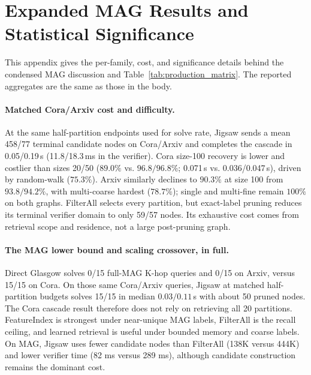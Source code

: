 \documentclass{article}
\begin{document}
\section{Expanded MAG Results and Statistical Significance}
\label{app:mag_narrative}

This appendix gives the per-family, cost, and significance details behind the condensed MAG discussion and Table~\ref{tab:production_matrix}. The reported aggregates are the same as those in the body.

\paragraph{Matched Cora/Arxiv cost and difficulty.} At the same half-partition endpoints used for solve rate, Jigsaw sends a mean 458/77 terminal candidate nodes on Cora/Arxiv and completes the cascade in 0.05/0.19\,s (11.8/18.3\,ms in the verifier). Cora size-100 recovery is lower and costlier than sizes 20/50 ($89.0\%$ vs. $96.8/96.8\%$; 0.071\,s vs. 0.036/0.047\,s), driven by random-walk ($75.3\%$). Arxiv similarly declines to $90.3\%$ at size 100 from $93.8/94.2\%$, with multi-coarse hardest ($78.7\%$); single and multi-fine remain $100\%$ on both graphs. FilterAll selects every partition, but exact-label pruning reduces its terminal verifier domain to only 59/57 nodes. Its exhaustive cost comes from retrieval scope and residence, not a large post-pruning graph.

\paragraph{The MAG lower bound and scaling crossover, in full.} Direct Glasgow solves 0/15 full-MAG K-hop queries and 0/15 on Arxiv, versus 15/15 on Cora. On those same Cora/Arxiv queries, Jigsaw at matched half-partition budgets solves 15/15 in median $0.03/0.11$\,s with about 50 pruned nodes. The Cora cascade result therefore does not rely on retrieving all 20 partitions. FeatureIndex is strongest under near-unique MAG labels, FilterAll is the recall ceiling, and learned retrieval is useful under bounded memory and coarse labels. On MAG, Jigsaw uses fewer candidate nodes than FilterAll (138K versus 444K) and lower verifier time (82 ms versus 289 ms), although candidate construction remains the dominant cost.
\end{document}
